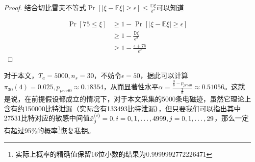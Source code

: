 {\begin{proof}
	结合切比雪夫不等式$\Pr\left[\vert \xi-\mathbb E\xi\vert\ge\epsilon\right]\le \frac{\mathbb D\xi}{\epsilon^2}$可以知道
	
	\begin{align*}
		\Pr\left[75\le\xi\right]&\ge1-\Pr\left[\vert \xi-\mathbb E\xi\vert\ge\epsilon\right]\\
		&\ge 1-\frac{\mathbb D\xi}{\epsilon^2}\\
		&\ge1-\frac{\epsilon+75}{\epsilon^2}
	\end{align*}

	\end{proof}
	对于本文，$T_a=5000,n_s=30$，不妨令$\epsilon=50$，据此可以计算$\pi_{30}(4)=0.025,p_{pred0}\approx0.18354$，从而显著性水平$\alpha=\frac{\frac38-p_{pred0}}{\frac38}\approx0.51056$。这就是说，在前提假设都成立的情况下，对于本文采集的5000条电磁迹，虽然它理论上含有约150000比特泄漏（实际含有133493比特泄漏），但只要我们可以指出其中27531比特对应的敏感中间值$\hat{x}^{(i)}_j=0,i=0,1,\dots,4999,j=0,1,\dots,29$，那么一定有超过95\%的概率\footnote{实际上概率的精确值保留16位小数的结果为0.9999992772226471}恢复私钥。
		

%


}
